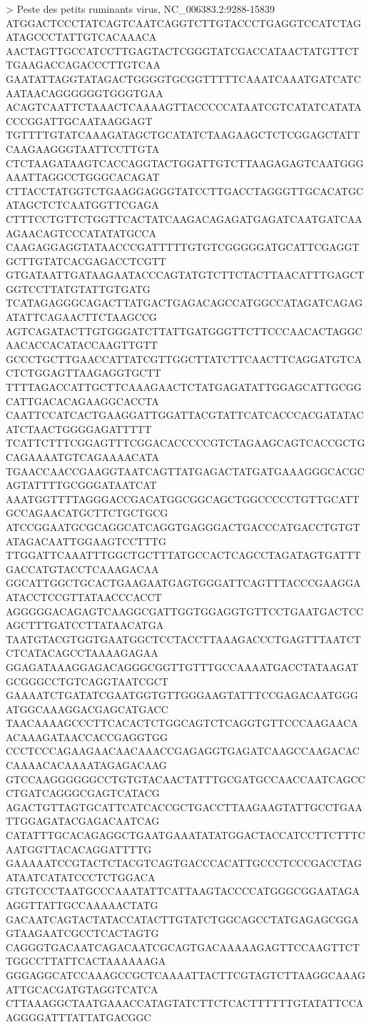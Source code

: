 > Peste des petits ruminants virus, NC_006383.2:9288-15839
ATGGACTCCCTATCAGTCAATCAGGTCTTGTACCCTGAGGTCCATCTAGATAGCCCTATTGTCACAAACA
AACTAGTTGCCATCCTTGAGTACTCGGGTATCGACCATAACTATGTTCTTGAAGACCAGACCCTTGTCAA
GAATATTAGGTATAGACTGGGGTGCGGTTTTTCAAATCAAATGATCATCAATAACAGGGGGGTGGGTGAA
ACAGTCAATTCTAAACTCAAAAGTTACCCCCATAATCGTCATATCATATACCCGGATTGCAATAAGGAGT
TGTTTTGTATCAAAGATAGCTGCATATCTAAGAAGCTCTCGGAGCTATTCAAGAAGGGTAATTCCTTGTA
CTCTAAGATAAGTCACCAGGTACTGGATTGTCTTAAGAGAGTCAATGGGAAATTAGGCCTGGGCACAGAT
CTTACCTATGGTCTGAAGGAGGGTATCCTTGACCTAGGGTTGCACATGCATAGCTCTCAATGGTTCGAGA
CTTTCCTGTTCTGGTTCACTATCAAGACAGAGATGAGATCAATGATCAAAGAACAGTCCCATATATGCCA
CAAGAGGAGGTATAACCCGATTTTTGTGTCGGGGGATGCATTCGAGGTGCTTGTATCACGAGACCTCGTT
GTGATAATTGATAAGAATACCCAGTATGTCTTCTACTTAACATTTGAGCTGGTCCTTATGTATTGTGATG
TCATAGAGGGCAGACTTATGACTGAGACAGCCATGGCCATAGATCAGAGATATTCAGAACTTCTAAGCCG
AGTCAGATACTTGTGGGATCTTATTGATGGGTTCTTCCCAACACTAGGCAACACCACATACCAAGTTGTT
GCCCTGCTTGAACCATTATCGTTGGCTTATCTTCAACTTCAGGATGTCACTCTGGAGTTAAGAGGTGCTT
TTTTAGACCATTGCTTCAAAGAACTCTATGAGATATTGGAGCATTGCGGCATTGACACAGAAGGCACCTA
CAATTCCATCACTGAAGGATTGGATTACGTATTCATCACCCACGATATACATCTAACTGGGGAGATTTTT
TCATTCTTTCGGAGTTTCGGACACCCCCGTCTAGAAGCAGTCACCGCTGCAGAAAATGTCAGAAAACATA
TGAACCAACCGAAGGTAATCAGTTATGAGACTATGATGAAAGGGCACGCAGTATTTTGCGGGATAATCAT
AAATGGTTTTAGGGACCGACATGGCGGCAGCTGGCCCCCTGTTGCATTGCCAGAACATGCTTCTGCTGCG
ATCCGGAATGCGCAGGCATCAGGTGAGGGACTGACCCATGACCTGTGTATAGACAATTGGAAGTCCTTTG
TTGGATTCAAATTTGGCTGCTTTATGCCACTCAGCCTAGATAGTGATTTGACCATGTACCTCAAAGACAA
GGCATTGGCTGCACTGAAGAATGAGTGGGATTCAGTTTACCCGAAGGAATACCTCCGTTATAACCCACCT
AGGGGGACAGAGTCAAGGCGATTGGTGGAGGTGTTCCTGAATGACTCCAGCTTTGATCCTTATAACATGA
TAATGTACGTGGTGAATGGCTCCTACCTTAAAGACCCTGAGTTTAATCTCTCATACAGCCTAAAAGAGAA
GGAGATAAAGGAGACAGGGCGGTTGTTTGCCAAAATGACCTATAAGATGCGGGCCTGTCAGGTAATCGCT
GAAAATCTGATATCGAATGGTGTTGGGAAGTATTTCCGAGACAATGGGATGGCAAAGGACGAGCATGACC
TAACAAAAGCCCTTCACACTCTGGCAGTCTCAGGTGTTCCCAAGAACAACAAAGATAACCACCGAGGTGG
CCCTCCCAGAAGAACAACAAACCGAGAGGTGAGATCAAGCCAAGACACCAAAACACAAAATAGAGACAAG
GTCCAAGGGGGGCCTGTGTACAACTATTTGCGATGCCAACCAATCAGCCCTGATCAGGGCGAGTCATACG
AGACTGTTAGTGCATTCATCACCGCTGACCTTAAGAAGTATTGCCTGAATTGGAGATACGAGACAATCAG
CATATTTGCACAGAGGCTGAATGAAATATATGGACTACCATCCTTCTTTCAATGGTTACACAGGATTTTG
GAAAAATCCGTACTCTACGTCAGTGACCCACATTGCCCTCCCGACCTAGATAATCATATCCCTCTGGACA
GTGTCCCTAATGCCCAAATATTCATTAAGTACCCCATGGGCGGAATAGAAGGTTATTGCCAAAAACTATG
GACAATCAGTACTATACCATACTTGTATCTGGCAGCCTATGAGAGCGGAGTAAGAATCGCCTCACTAGTG
CAGGGTGACAATCAGACAATCGCAGTGACAAAAAGAGTTCCAAGTTCTTGGCCTTATTCACTAAAAAAGA
GGGAGGCATCCAAAGCCGCTCAAAATTACTTCGTAGTCTTAAGGCAAAGATTGCACGATGTAGGTCATCA
CTTAAAGGCTAATGAAACCATAGTATCTTCTCACTTTTTTGTATATTCCAAGGGGATTTATTATGACGGC
